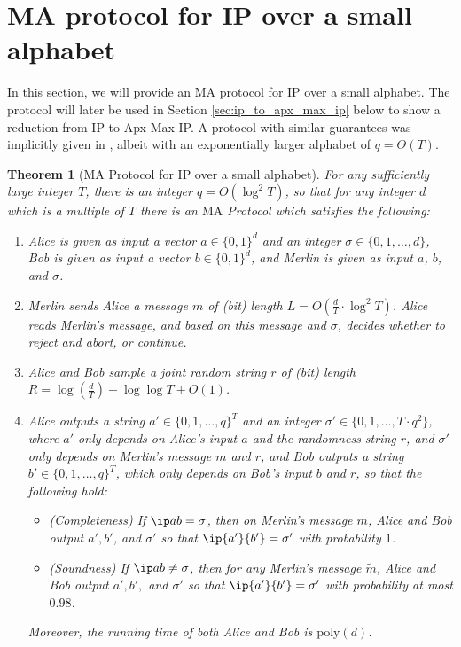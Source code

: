 \documentclass[11pt]{article}
\theoremstyle{plain}
\newtheorem{thm}{Theorem}[section]
\theoremstyle{remark}
\newcommand{\ma}{\mathrm{MA}}
\newcommand{\IP}{\mathrm{IP}}
\newcommand{\poly}{\mathrm{poly}}
\begin{document}
 
\section{MA protocol for IP over a small alphabet}\label{sec:ma}

In this section, we will provide an MA protocol for IP over a small alphabet. The protocol will later be used in Section \ref{sec:ip_to_apx_max_ip} below to show a reduction from IP to Apx-Max-IP. A  protocol with similar guarantees was implicitly given in \cite{CW19}, albeit with an exponentially larger alphabet of  $q=\Theta(T)$. 

\begin{thm}[MA Protocol for $\IP$ over a small alphabet]\label{thm:ma} 
For any sufficiently large integer $T$, there is an integer  $q=O(\log ^2 T)$, so that for 
 any integer $d$ which is a multiple of $T$ there is an $\ma$ Protocol which satisfies the following:
\begin{enumerate}
\item Alice is given as input a vector $a \in\{0,1\}^{d}$  and an integer $\sigma \in \{0,1,\ldots,d\}$,
Bob is given as input a vector $b \in \{0,1\}^{d}$, and Merlin is given as input
$a$, $b$, and $\sigma$.
\item Merlin sends Alice a message $m$ of (bit) length $L=O(\frac d T \cdot \log^2 T)$.
 Alice reads Merlin's message, and based on this message and $\sigma$, decides whether to reject and abort, or continue.
\item Alice and Bob sample a joint random string $r$ of (bit) length $R=\log(\frac{d}{T})+ \log \log T+O(1)$.
\item Alice outputs  a string
$a' \in \{0,1,\ldots,q\}^T$ and an integer $\sigma' \in \{0,1,\ldots, T \cdot q^2\}$, where $a'$ only depends on Alice's input $a$ and the randomness string $r$,  
and $\sigma'$ only depends on Merlin's message $m$ and $r$,  and Bob outputs a string $b' \in \{0,1,\ldots,q\}^T$, which only depends on Bob's input $b$ and  $r$, so that the following hold:
\begin{itemize}
\item (Completeness) If $\ip a b= \sigma$, then on Merlin's message $m$, Alice and Bob output $a', b'$, and $\sigma'$ so that $\ip {a'} {b'} = \sigma'$ with probability $1$. 
\item (Soundness) If $\ip a b \neq \sigma$, then for any Merlin's message $\tilde m$, Alice and Bob output $a', b',$ and $\sigma'$ so that $\ip {a'} {b'} = \sigma'$ with probability at most $0.98$.
\end{itemize}

Moreover, the running time of both Alice and Bob is $\poly(d)$.
\end{enumerate}
\end{thm}
\end{document}
